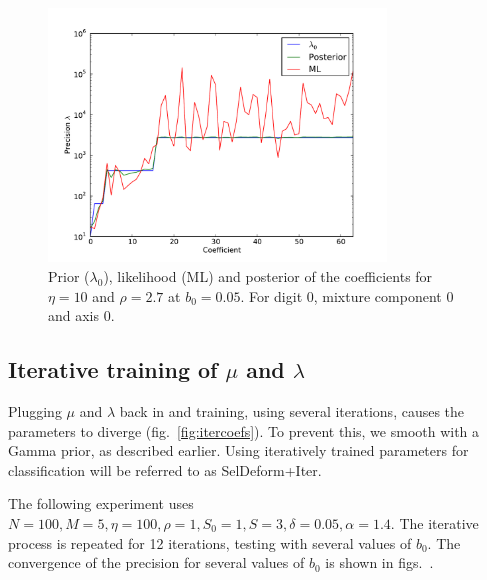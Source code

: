 \documentclass{report}
\begin{document}
\begin{figure}
    \centering
    \includegraphics[width=0.8\textwidth]{figs/plotb000-eta10-rho2-7.pdf}
    \caption{Prior ($\lambda_0$), likelihood (ML) and posterior of the coefficients for $\eta=10$ and $\rho=2.7$ at $b_0 = 0.05$. For digit 0, mixture component 0 and axis 0.} \label{fig:rho27}
\end{figure}


\subsection{Iterative training of $\mu$ and $\lambda$}
Plugging $\mu$ and $\lambda$ back in and training, using several iterations, causes the parameters to diverge (fig.~\ref{fig:itercoefs}). To prevent this, we smooth with a Gamma prior, as described earlier. Using iteratively trained parameters for classification will be referred to as SelDeform+Iter.

The following experiment uses $N=100, M=5, \eta=100, \rho=1, S_0=1, S=3, \delta=0.05, \alpha=1.4$. The iterative process is repeated for 12 iterations, testing with several values of $b_0$. The convergence of the precision for several values of $b_0$ is shown in figs.~.
\end{document}
